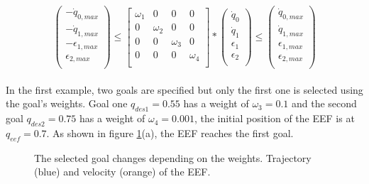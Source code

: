 $$
\left( \begin{array}{c}
-\dot{q}_{0,max} \\
-\dot{q}_{1,max} \\
-\epsilon_{1,max} \\
\epsilon_{2,max} \\
\end{array}
\right)	\leq 
\left[ \begin{array}{cccc}
\omega_{1} & 0 & 0 & 0 \\
0 & \omega_{2} & 0 & 0 \\
0 & 0 & \omega_{3} & 0 \\
0 & 0 & 0 & \omega_{4} \\
\end{array}
\right] *
\left( \begin{array}{c}
\dot{q}_{0} \\
\dot{q}_{1} \\
\epsilon_1 \\
\epsilon_2 \\
\end{array}
\right) 
\leq \left( \begin{array}{c}
\dot{q}_{0,max} \\
\dot{q}_{1,max} \\
\epsilon_{1,max} \\
\epsilon_{2,max} \\
\end{array}
\right)
$$
\\
In the first example, two goals are specified but only the first one is selected using the goal's weights. Goal one $q_{des1} = 0.55$ has a weight of $\omega_{3} = 0.1$ and the second goal $q_{des2} = 0.75$ has a weight of $\omega_{4} = 0.001$, the initial position of the EEF is at $q_{eef} = 0.7$. As shown in figure \ref{fig:goal1}(a), the EEF reaches the first goal.

\begin{figure}[H]
	\centering
	\begin{subfigure}[First Goal]
		{\texttt{[image: controllers/multip\_1.png]}}
	\end{subfigure}
	\begin{subfigure}[Second goal]
		{\texttt{[image: controllers/multip\_2.png]}}
	\end{subfigure}
	\vspace{-12pt}
	\caption[Multiple goals]{The selected goal changes depending on the weights. Trajectory (blue) and velocity (orange) of the EEF.}
	\vspace{-10pt}
	\label{fig:goal1}
\end{figure}

